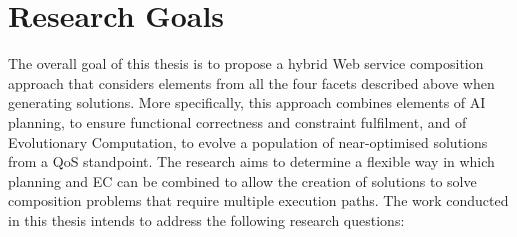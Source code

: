 \section{Research Goals}
The overall goal of this thesis is to propose a hybrid  Web service composition approach that considers elements from all the four facets described above when generating solutions. More specifically, this approach combines elements of AI planning, to ensure functional correctness and constraint fulfilment, and of Evolutionary Computation, to evolve a population of near-optimised solutions from a QoS standpoint. The research aims to determine a flexible way in which planning and EC can be combined to allow the creation of solutions to solve composition problems that require multiple execution paths. The work conducted in this thesis intends to address the following research questions:

